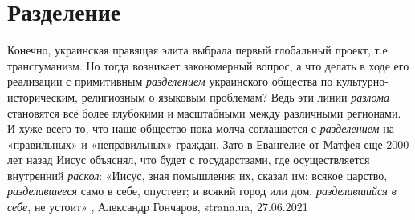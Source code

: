  
 
 
 
 
\chapter{Разделение}

Конечно, украинская правящая элита выбрала первый глобальный проект, т.е.
трансгуманизм. Но тогда возникает закономерный вопрос, а что делать в ходе его
реализации с примитивным \emph{разделением} украинского общества по
культурно-историческим, религиозным о языковым проблемам? Ведь эти линии
\emph{разлома} становятся всё более глубокими и масштабными между различными
регионами. И хуже всего то, что наше общество пока молча соглашается с
\emph{разделением} на «правильных» и «неправильных» граждан.  Зато в Евангелие от
Матфея еще 2000 лет назад Иисус объяснял, что будет с государствами, где
осуществляется внутренний \emph{раскол}: «Иисус, зная помышления их, сказал им: всякое
царство, \emph{разделившееся} само в себе, опустеет; и всякий город или дом,
\emph{разделившийся в себе}, не устоит»
, 
Александр Гончаров, strana.ua, 27.06.2021

